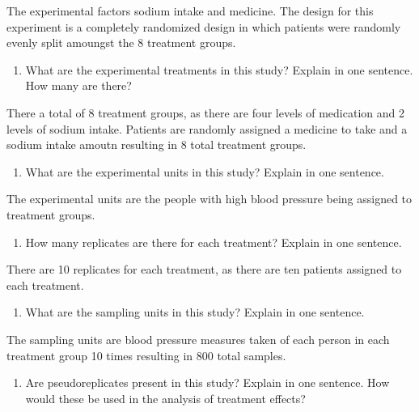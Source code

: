 \documentclass[]{article}
\providecommand{\tightlist}{%
  \setlength{\itemsep}{0pt}\setlength{\parskip}{0pt}}
\begin{document}
The experimental factors sodium intake and medicine. The design for this
experiment is a completely randomized design in which patients were
randomly evenly split amoungst the 8 treatment groups.

\begin{enumerate}
\def\labelenumi{\Alph{enumi})}
\setcounter{enumi}{1}
\tightlist
\item
  What are the experimental treatments in this study? Explain in one
  sentence. How many are there?
\end{enumerate}

There a total of 8 treatment groups, as there are four levels of
medication and 2 levels of sodium intake. Patients are randomly assigned
a medicine to take and a sodium intake amoutn resulting in 8 total
treatment groups.

\begin{enumerate}
\def\labelenumi{\Alph{enumi})}
\setcounter{enumi}{2}
\tightlist
\item
  What are the experimental units in this study? Explain in one
  sentence.
\end{enumerate}

The experimental units are the people with high blood pressure being
assigned to treatment groups.

\begin{enumerate}
\def\labelenumi{\Alph{enumi})}
\setcounter{enumi}{3}
\tightlist
\item
  How many replicates are there for each treatment? Explain in one
  sentence.
\end{enumerate}

There are 10 replicates for each treatment, as there are ten patients
assigned to each treatment.

\begin{enumerate}
\def\labelenumi{\Alph{enumi})}
\setcounter{enumi}{4}
\tightlist
\item
  What are the sampling units in this study? Explain in one sentence.
\end{enumerate}

The sampling units are blood pressure measures taken of each person in
each treatment group 10 times resulting in 800 total samples.

\begin{enumerate}
\def\labelenumi{\Alph{enumi})}
\setcounter{enumi}{5}
\tightlist
\item
  Are pseudoreplicates present in this study? Explain in one sentence.
  How would these be used in the analysis of treatment effects?
\end{enumerate}
\end{document}
